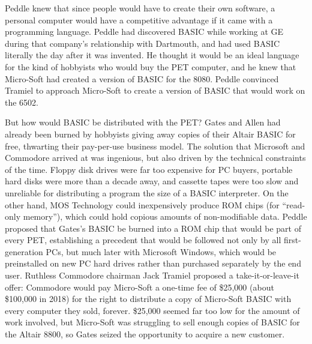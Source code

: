 Peddle knew that since people would have to create their own software,
a personal computer would have a competitive advantage if it came with
a programming language.
Peddle had discovered BASIC while working at GE during that company's
relationship with Dartmouth, and had used BASIC literally the day
after it was invented.
He thought it would be an ideal language for the kind of hobbyists
who would buy the PET computer, and he knew that Micro-Soft had
created a version of BASIC for the 8080.
Peddle convinced Tramiel to approach Micro-Soft to create a version of
BASIC that would work on the 6502.


But how would BASIC be distributed with the PET?
Gates and Allen had already been burned by hobbyists giving away
copies of their Altair BASIC for free, thwarting their pay-per-use
business model.
The solution that Microsoft and Commodore arrived at was ingenious,
but also driven by the technical constraints of the time.
Floppy disk drives were far too expensive for PC buyers, portable hard
disks were more than a decade away, and cassette tapes were too slow
and unreliable for distributing a program the size of a BASIC
interpreter.
On the other hand, MOS Technology could inexpensively produce ROM
chips (for ``read-only memory''), which could hold copious amounts of
non-modifiable data.
Peddle proposed that Gates's BASIC be burned into a ROM chip that
would be part of every PET, establishing a precedent that would be
followed not only by all first-generation PCs, but much later with
Microsoft Windows, which would be preinstalled on new PC hard drives
rather than purchased separately by the end user.
Ruthless Commodore chairman Jack Tramiel proposed a
take-it-or-leave-it offer: Commodore would pay Micro-Soft a one-time
fee of \$25,000 (about \$100,000 in 2018) for the right to distribute
a copy of Micro-Soft BASIC with every computer they sold, forever.
\$25,000 seemed far too low for the amount of work involved, but
Micro-Soft was struggling to sell enough copies of BASIC for the
Altair 8800, so Gates seized the opportunity to acquire a new
customer.


